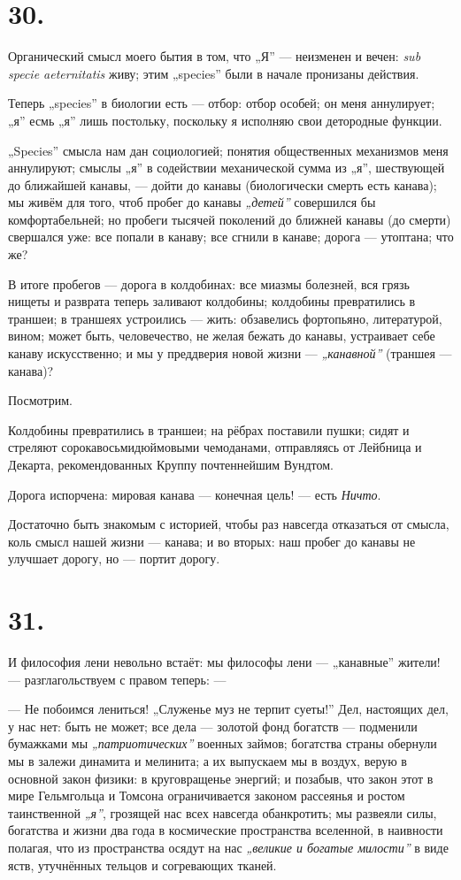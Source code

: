 \documentclass[12pt,a4paper,oneside]{book}
\begin{document}
\section*{30.}

Органический смысл моего бытия в том, что „Я” — неизменен и вечен: \emph{sub specie aeternitatis} живу; этим „species” были в начале пронизаны действия.

Теперь „species” в биологии есть — отбор: отбор особей; он меня аннулирует; „я” есмь „я” лишь постольку, поскольку я исполняю свои детородные функции.

„Species” смысла нам дан социологией; понятия общественных механизмов меня аннулируют; смыслы „я” в содействии механической сумма из „я”, шествующей до ближайшей канавы, — дойти до канавы (биологически смерть есть канава); мы живём для того, чтоб пробег до канавы \emph{„детей”} совершился бы комфортабельней; но пробеги тысячей поколений до ближней канавы (до смерти) свершался уже: все попали в канаву; все сгнили в канаве; дорога — утоптана; что же?

В итоге пробегов — дорога в колдобинах: все миазмы болезней, вся грязь нищеты и разврата теперь заливают колдобины; колдобины превратились в траншеи; в траншеях устроились — жить: обзавелись фортопьяно, литературой, вином; может быть, человечество, не желая бежать до канавы, устраивает себе канаву искусственно; и мы у преддверия новой жизни — \emph{„канавной”} (траншея — канава)?

Посмотрим.

Колдобины превратились в траншеи; на рёбрах поставили пушки; сидят и стреляют сорокавосьмидюймовыми чемоданами, отправляясь от Лейбница и Декарта, рекомендованных Круппу почтеннейшим Вундтом.

Дорога испорчена: мировая канава — конечная цель! — есть \emph{Ничто}.

Достаточно быть знакомым с историей, чтобы раз навсегда отказаться от смысла, коль смысл нашей жизни — канава; и во вторых: наш пробег до канавы не улучшает дорогу, но — портит дорогу.

\section*{31.}

И философия лени невольно встаёт: мы философы лени — „канавные” жители! — разглагольствуем с правом теперь: —

— Не побоимся лениться! „Служенье муз не терпит суеты!” Дел, настоящих дел, у нас нет: быть не может; все дела — золотой фонд богатств — подменили бумажками мы \emph{„патриотических”} военных займов; богатства страны обернули мы в залежи динамита и мелинита; а их выпускаем мы в воздух, верую в основной закон физики: в круговращенье энергий; и позабыв, что закон этот в мире Гельмгольца и Томсона ограничивается законом рассеянья и ростом таинственной \emph{„я”}, грозящей нас всех навсегда обанкротить; мы развеяли силы, богатства и жизни два года в космические пространства вселенной, в наивности полагая, что из пространства осядут на нас \emph{„великие и богатые милости”} в виде яств, утучнённых тельцов и согревающих тканей.
\end{document}

